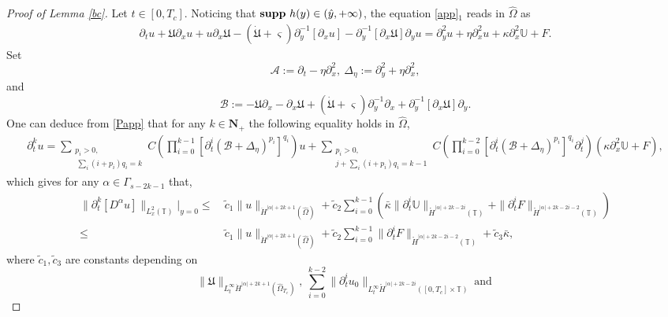 \documentclass{amsart}
\numberwithin{equation}{section}
\begin{document}
\begin{proof}[Proof of Lemma \ref{bc}]
Let $t\in[0,T_{c}]$. Noticing that ${\bf supp}~h(y)\in(\hat{y},+\infty)$, the equation \eqref{app}$_{1}$ reads in $\hat{\Omega}$ as
\begin{align}\label{Papp}
\partial_{t}u
+\mathfrak{U}\partial_{x}u+u\partial_{x}\mathfrak{U}
-(\dot{\mathfrak{U}}+\varsigma)\partial_{y}^{-1}[\partial_{x}u]
-\partial_{y}^{-1}[\partial_{x}\mathfrak{U}]\partial_{y}u
=\partial_{y}^{2}u+\eta\partial_{x}^{2}u+\kappa\partial_{x}^{2}\mathbb{U}+F.
\end{align}
Set
$$\mathcal{A}:=\partial_{t}-\eta\partial_{x}^{2},~\Delta_{\eta}:=\partial_{y}^{2}+\eta\partial_{x}^{2},$$
and
$$\mathcal{B}:=-\mathfrak{U}\partial_{x}-\partial_{x}\mathfrak{U}+(\dot{\mathfrak{U}}+\varsigma)\partial_{y}^{-1}\partial_{x}+\partial_{y}^{-1}[\partial_{x}\mathfrak{U}]\partial_{y}.$$
One can deduce from \eqref{Papp} that for any $k\in\mathbf{N}_{+}$ the following equality holds in $\hat{\Omega}$,
\begin{align*}
\partial_{t}^{k}u
=\sum_{\substack{p_{i}>0,\\~\sum\limits_{i}(i+p_{i})q_{i}=k}}C\left(\prod_{i=0}^{k-1}[\partial_{t}^{i}(\mathcal{B}+\Delta_{\eta})^{p_{i}}]^{q_{i}}\right)u
 +\sum_{\substack{p_{i}>0,\\j+\sum\limits_{i}(i+p_{i})q_{i}=k-1}}C\left(\prod_{i=0}^{k-2}[\partial_{t}^{i}(\mathcal{B}+\Delta_{\eta})^{p_{i}}]^{q_{i}}\partial_{t}^{j}\right)(\kappa\partial_{x}^{2}\mathbb{U}+F),
\end{align*}
which gives for any $\alpha\in\Gamma_{s-2k-1}$ that,
\begin{align}\label{ube}
\|\partial_{t}^{k}[D^{\alpha}u]\|_{L_{x}^{2}(\mathbb{T})}|_{y=0}
\leq&~\tilde{c}_{1}\|u\|_{\ddot{H}^{|\alpha|+2k+1}(\hat{\Omega})}
     +\tilde{c}_{2}\sum_{i=0}^{k-1}\left(\bar{\kappa}\|\partial_{t}^{i}\mathbb{U}\|_{\mathring{H}^{|\alpha|+2k-2i}(\mathbb{T})}+\|\partial_{t}^{i}F\|_{\mathring{H}^{|\alpha|+2k-2i-2}(\mathbb{T})}\right)\\
\leq&~\tilde{c}_{1}\|u\|_{\ddot{H}^{|\alpha|+2k+1}(\hat{\Omega})}
     +\tilde{c}_{2}\sum_{i=0}^{k-1}\|\partial_{t}^{i}F\|_{\mathring{H}^{|\alpha|+2k-2i-2}(\mathbb{T})}
     +\tilde{c}_{3}\bar{\kappa},\nonumber
\end{align}
where $\tilde{c}_{1},\tilde{c}_{3}$ are constants depending on
$$\|\mathfrak{U}\|_{L_{t}^{\infty}\ddot{H}^{|\alpha|+2k+1}(\hat{\Omega}_{T_{c}})},~
 \sum\limits_{i=0}^{k-2}\|\partial_{t}^{i}u_{0}\|_{L_{t}^{\infty}\mathring{H}^{|\alpha|+2k-2i}([0,T_{c}]\times\mathbb{T})}~\text{and}~
$$
\end{proof}
\end{document}
